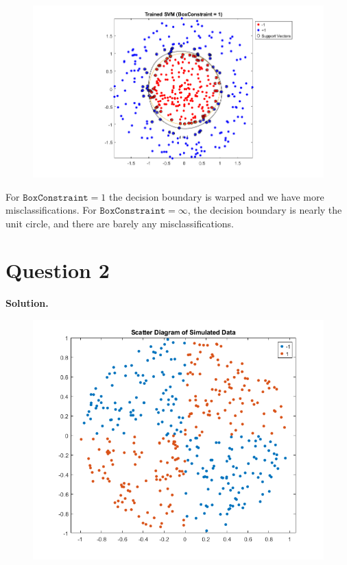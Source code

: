\documentclass[11pt]{article}
\begin{document}
\begin{figure}[!h]
  \centering
  \includegraphics[width=1.0\textwidth]{../q1/trained_svm_1.png}
  \label{fig:trained_svm_1}
\end{figure}


For \(\texttt{BoxConstraint}=1\) the decision boundary is warped and we have more misclassifications. For \(\texttt{BoxConstraint}=\infty\), the decision boundary is nearly the unit circle, and there are barely any misclassifications.














\clearpage
\section*{Question 2}

\textbf{Solution.}




\begin{figure}[!h]
  \centering
  \includegraphics[width=1.0\textwidth]{../q2/scatter.png}
  \label{fig:scatter}
\end{figure}
\end{document}
